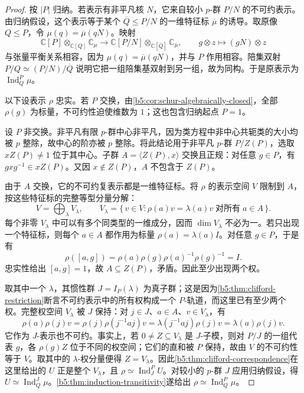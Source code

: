 \begin{proof}
	按 \(|P|\) 归纳。若表示有非平凡核 \(N\)，它来自较小 \(p\)-群 \(P/N\) 的不可约表示。由归纳假设，这个表示等于某个 \(\overline Q\le P/N\) 的一维特征标 \(\overline\mu\) 的诱导。取原像 \(Q\le P\)，令 \(\mu(q)=\overline\mu(qN)\)。映射
	\[
		\mathbb C[P]\otimes_{\mathbb C[Q]}\mathbb C_\mu \longrightarrow \mathbb C[P/N]\otimes_{\mathbb C[\overline Q]}\mathbb C_{\overline\mu}, \qquad g\otimes z\longmapsto(gN)\otimes z
	\]
	与张量平衡关系相容，因为 \(\mu(q)=\overline\mu(qN)\)，并与 \(P\) 作用相容。陪集双射 \(P/Q\simeq(P/N)/\overline Q\) 说明它把一组陪集基双射到另一组，故为同构。于是原表示为 \(\operatorname{Ind}_Q^P\mu\)。

	以下设表示 \(\rho\) 忠实。若 \(P\) 交换，由\cref{b5:cor:schur-algebraically-closed}，全部 \(\rho(g)\) 为标量，不可约性迫使维数为 \(1\)；这也包含归纳起点 \(P=1\)。

	设 \(P\) 非交换。非平凡有限 \(p\)-群中心非平凡，因为类方程中非中心共轭类的大小均被 \(p\) 整除，故中心的阶亦被 \(p\) 整除。将此结论用于非平凡 \(p\)-群 \(P/Z(P)\)，选取 \(xZ(P)\ne1\) 位于其中心。子群 \(A=\bigl\langle Z(P),x\bigr\rangle\) 交换且正规：对任意 \(g\in P\)，有 \(gxg^{-1}\in xZ(P)\)。又因 \(x\notin Z(P)\)，\(A\) 不包含于 \(Z(P)\)。

	由于 \(A\) 交换，它的不可约复表示都是一维特征标。将 \(\rho\) 的表示空间 \(V\) 限制到 \(A\)，按这些特征标的完整等型分量分解：
	\[
		V=\bigoplus_\lambda V_\lambda,\qquad V_\lambda=\{\,v\in V:\rho(a)v=\lambda(a)v\;\text{对所有}\;a\in A\,\}.
	\]
	每个非零 \(V_\lambda\) 中可以有多个同类型的一维成分，因而 \(\dim V_\lambda\) 不必为一。若只出现一个特征标，则每个 \(a\in A\) 都作用为标量 \(\rho(a)=\lambda(a)I\)。对任意 \(g\in P\)，于是有
	\[
		\rho([a,g]) =\rho(a)\rho(g)\rho(a)^{-1}\rho(g)^{-1}=I.
	\]
	忠实性给出 \([a,g]=1\)，故 \(A\subseteq Z(P)\)，矛盾。因此至少出现两个权。

	取其中一个 \(\lambda\)，其惯性群 \(J=I_P(\lambda)\) 为真子群；这是因为\cref{b5:thm:clifford-restriction}断言不可约表示中的所有权构成一个 \(P\)-轨道，而这里已有至少两个权。完整权空间 \(V_\lambda\) 被 \(J\) 保持：对 \(j\in J\)、\(a\in A\)、\(v\in V_\lambda\)，有
	\[
		\rho(a)\rho(j)v =\rho(j)\rho(j^{-1}aj)v =\lambda(j^{-1}aj)\rho(j)v =\lambda(a)\rho(j)v.
	\]
	它作为 \(J\)-表示也不可约。事实上，若 \(0\ne Z\subseteq V_\lambda\) 是 \(J\)-子模，则对 \(P/J\) 的一组代表 \(g\)，各 \(\rho(g)Z\) 位于不同的权空间；它们的直和被 \(P\) 保持，故由 \(V\) 的不可约性等于 \(V\)。取其中的 \(\lambda\)-权分量便得 \(Z=V_\lambda\)。因此\cref{b5:thm:clifford-correspondence}在这里给出的 \(U\) 正是整个 \(V_\lambda\)，且 \(\rho\simeq\operatorname{Ind}_J^P U\)。对较小的 \(p\)-群 \(J\) 应用归纳假设，得 \(U\simeq\operatorname{Ind}_Q^J\mu\)。\cref{b5:thm:induction-transitivity}遂给出 \(\rho\simeq\operatorname{Ind}_Q^P\mu\)。
\end{proof}

